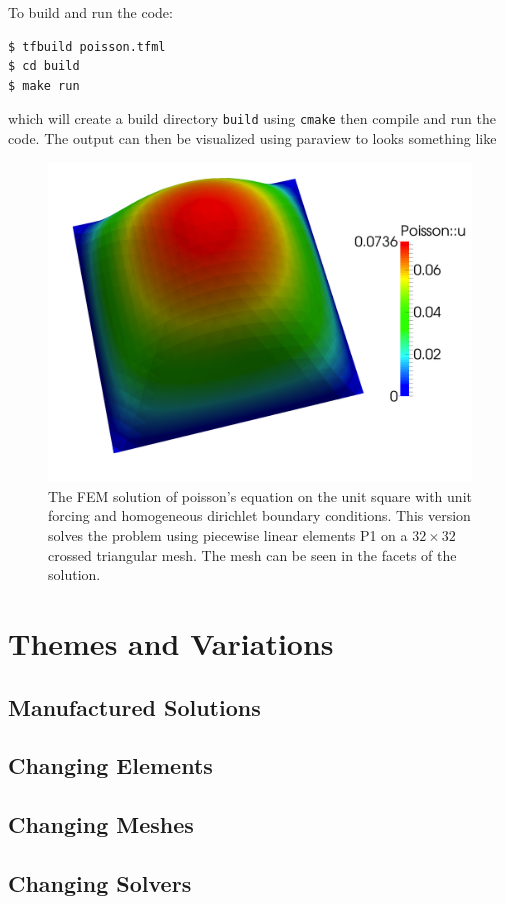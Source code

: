 \documentclass[10pt,twoside,openright]{memoir}
\begin{document}
To build and run the code:
\begin{lstlisting}[style=Bash]
$ tfbuild poisson.tfml
$ cd build
$ make run 
\end{lstlisting}
which will create a build directory \texttt{build} using
\texttt{cmake} then compile and run the code. The output  can then be
visualized using paraview to looks something like
\begin{figure}[h]
  \centering
  \includegraphics[width=.9\textwidth]{figures/poisson_simple.png}
  \caption{\protect\small The FEM solution of poisson's equation on the unit square
    with unit forcing and homogeneous dirichlet boundary conditions.
    This version solves the problem using piecewise linear elements P1
    on a $32\times 32$ crossed triangular mesh. The mesh can be seen
    in the facets of the solution.}
  \label{fig:simple_poisson}
\end{figure}



  




\section{Themes and Variations}
\label{sec:themes-variations}

\subsection{Manufactured Solutions}
\label{sec:manuf-solut}

\subsection{Changing Elements}
\label{sec:changing-elements}

\subsection{Changing Meshes}
\label{sec:changing-meshes}

\subsection{Changing Solvers}
\label{sec:changing-solvers}
\end{document}
